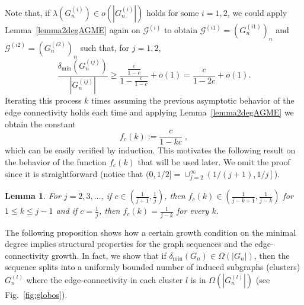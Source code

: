 \documentclass[a4paper,onecolumn,accepted=2024-12-14]{quantumarticle}
\newtheorem{lemma}[theorem]{Lemma}
\theoremstyle{plain}
\newcommand{\cG}{{\mathcal G}}         %
\begin{document}
Note that, if $\lambda(G_n^{(i)})\in o\left(|G_n^{(i)}|\right)$ holds for some $i=1,2$, we could apply Lemma~\ref{lemma2degAGME} again on $\cG^{(i)}$ to obtain $\cG^{(i1)}=\left(G_n^{(i1)}\right)_n$ and $\cG^{(i2)}=\left(G_n^{(i2)}\right)_n$ such that, for $j=1,2$,
\begin{equation}
 \frac{\delta_{\mathrm{min}}(G_n^{(ij)})}{|G_n^{(ij)}|}\geq
 \frac{\frac{c}{1-c}}{1-\frac{c}{1-c}}+o(1)= \frac{c}{1-2c}+o(1).
\end{equation}
Iterating this process $k$ times assuming the previous asymptotic behavior of the edge connectivity holds each time and applying Lemma~\ref{lemma2degAGME} we obtain the constant
\begin{equation}\label{fc}
 f_c(k):=\frac{c}{1-kc}\;,
\end{equation}
which can be easily verified by induction. This motivates the following result on the behavior of the function $f_c(k)$ that will be used later. We omit the proof since it is straightforward (notice that $(0,1/2]=\cup_{j=2}^\infty \left(1/(j+1),1/j\right]$).

\begin{lemma}\label{lemma_f_c}
For $j=2,3,\dots$, if $c\in \left(\frac{1}{j+1}, \frac{1}{j}\right)$, then
 $f_c(k)\in \left(\frac{1}{j-k+1},\frac{1}{j-k}\right)$ for $1\leq k\leq j-1$ and
 if $c=\frac{1}{j}$, then $f_c(k)=\frac{1}{j-k}$ for every $k$.
\end{lemma}

The following proposition shows how a certain growth condition on the minimal degree implies structural properties for the graph sequences and the edge-connectivity growth.
In fact, we show that if $\delta_{\mathrm{min}}(G_n)\in\Omega(|G_n|)$, then the sequence splits into a uniformly bounded number of induced subgraphs (clusters) $G_n^{(l)}$ where the edge-connectivity in each cluster $l$ is in $\Omega(|G_n^{(l)}|)$ (see Fig.~\ref{fig:globos}).
\end{document}
